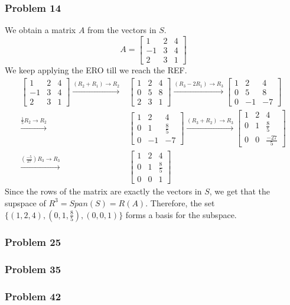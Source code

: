 \documentclass[a4paper,12pt]{article}
\begin{document}
\subsubsection*{Problem 14}
We obtain a matrix $A$ from the vectors in $S$. \[A=\begin{bmatrix}
  1 & 2 & 4 \\
  -1 & 3 & 4 \\
  2 & 3 & 1
\end{bmatrix}\]
We keep applying the ERO till we reach the REF.
\begin{align*}
    \begin{bmatrix}
  1 & 2 & 4 \\
  -1 & 3 & 4 \\
  2 & 3 & 1
\end{bmatrix} \xrightarrow{{(R_2+R_1)}\to{R_2}}&
 \begin{bmatrix}
  1 & 2 & 4 \\
  0 & 5 & 8 \\
  2 & 3 & 1
\end{bmatrix} \xrightarrow{{(R_3-2R_1)}\to{R_3}}
\begin{bmatrix}
  1 & 2 & 4 \\
  0 & 5 & 8 \\
  0 & -1 & -7
\end{bmatrix}\\ \xrightarrow{{\frac{1}{5} R_2}\to{R_2}}&
\begin{bmatrix}
  1 & 2 & 4 \\
  0 & 1 & \frac{8}{5} \\
  0 & -1 & -7
\end{bmatrix} \xrightarrow{{(R_3+R_2)}\to{R_3}}
\begin{bmatrix}
  1 & 2 & 4 \\
  0 & 1 & \frac{8}{5} \\
  0 & 0 & \frac{-27}{5}
\end{bmatrix}\\ \xrightarrow{{(\frac{-5}{27})R_3}\to{R_3}}&
\begin{bmatrix}
  1 & 2 & 4 \\
  0 & 1 & \frac{8}{5} \\
  0 & 0 & 1
\end{bmatrix}
\end{align*}
Since the rows of the matrix are exactly the vectors in $S$, we get that the supspace of $R^3= Span(S)= R(A).$
Therefore, the set $\{(1,2,4),(0,1,\frac{8}{5}), (0,0,1)\}$ forms a basis for the subspace.
\subsubsection*{Problem 25}
\subsubsection*{Problem 35}
\subsubsection*{Problem 42}
\end{document}
